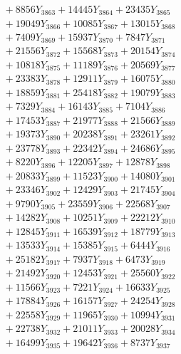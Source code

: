 \documentclass[a4paper,10pt]{article}
\begin{document}
{\begin{align}
&\;  + 8856 Y_{3863} + 14445 Y_{3864} + 23435 Y_{3865} \\[0.3ex]
&\;  + 19049 Y_{3866} + 10085 Y_{3867} + 13015 Y_{3868} \\[0.5ex]\allowbreak
&\;  + 7409 Y_{3869} + 15937 Y_{3870} + 7847 Y_{3871} \\[0.3ex]
&\;  + 21556 Y_{3872} + 15568 Y_{3873} + 20154 Y_{3874} \\[0.3ex]
&\;  + 10818 Y_{3875} + 11189 Y_{3876} + 20569 Y_{3877} \\[0.3ex]
&\;  + 23383 Y_{3878} + 12911 Y_{3879} + 16075 Y_{3880} \\[0.3ex]
&\;  + 18859 Y_{3881} + 25418 Y_{3882} + 19079 Y_{3883} \\[0.3ex]
&\;  + 7329 Y_{3884} + 16143 Y_{3885} + 7104 Y_{3886} \\[0.3ex]
&\;  + 17453 Y_{3887} + 21977 Y_{3888} + 21566 Y_{3889} \\[0.3ex]
&\;  + 19373 Y_{3890} + 20238 Y_{3891} + 23261 Y_{3892} \\[0.3ex]
&\;  + 23778 Y_{3893} + 22342 Y_{3894} + 24686 Y_{3895} \\[0.3ex]
&\;  + 8220 Y_{3896} + 12205 Y_{3897} + 12878 Y_{3898} \\[0.5ex]\allowbreak
&\;  + 20833 Y_{3899} + 11523 Y_{3900} + 14080 Y_{3901} \\[0.3ex]
&\;  + 23346 Y_{3902} + 12429 Y_{3903} + 21745 Y_{3904} \\[0.3ex]
&\;  + 9790 Y_{3905} + 23559 Y_{3906} + 22568 Y_{3907} \\[0.3ex]
&\;  + 14282 Y_{3908} + 10251 Y_{3909} + 22212 Y_{3910} \\[0.3ex]
&\;  + 12845 Y_{3911} + 16539 Y_{3912} + 18779 Y_{3913} \\[0.3ex]
&\;  + 13533 Y_{3914} + 15385 Y_{3915} + 6444 Y_{3916} \\[0.3ex]
&\;  + 25182 Y_{3917} + 7937 Y_{3918} + 6473 Y_{3919} \\[0.3ex]
&\;  + 21492 Y_{3920} + 12453 Y_{3921} + 25560 Y_{3922} \\[0.3ex]
&\;  + 11566 Y_{3923} + 7221 Y_{3924} + 16633 Y_{3925} \\[0.3ex]
&\;  + 17884 Y_{3926} + 16157 Y_{3927} + 24254 Y_{3928} \\[0.5ex]\allowbreak
&\;  + 22558 Y_{3929} + 11965 Y_{3930} + 10994 Y_{3931} \\[0.3ex]
&\;  + 22738 Y_{3932} + 21011 Y_{3933} + 20028 Y_{3934} \\[0.3ex]
&\;  + 16499 Y_{3935} + 19642 Y_{3936} + 8737 Y_{3937} \\[0.3ex]

\end{align}}
\end{document}
